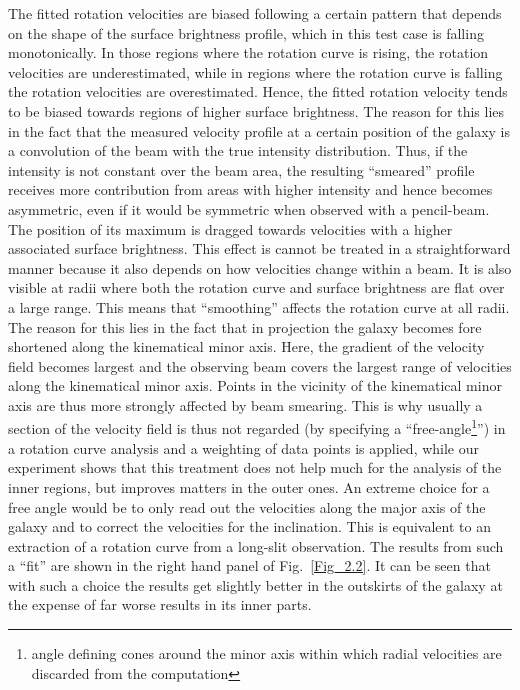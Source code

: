 \documentclass[oldversion]{aa}
\newcommand{\cng}[1]{{#1}}
\begin{document}
The fitted rotation velocities are biased following a certain pattern
that depends on the shape of the surface brightness profile, which in
this test case is falling monotonically.  In those regions where the
rotation curve is rising, the rotation velocities are underestimated,
while in regions where the rotation curve is falling the rotation
velocities are overestimated.  Hence, the fitted rotation velocity tends
to be biased towards regions of higher surface brightness.  The reason
for this lies in the fact that the measured velocity profile at a
certain position of the galaxy is a convolution of the beam with the
true intensity distribution.  Thus, if the intensity is not constant
over the beam area, the resulting ``smeared'' profile receives more
contribution from areas with higher intensity and hence becomes
asymmetric, even if it would be symmetric \cng{when observed with} a pencil-beam.  The
position of its maximum is dragged towards velocities with a higher
associated surface brightness.  This effect is \cng{cannot be treated} in a
straightforward manner  because it also depends on how velocities
change within a beam. It is also visible at radii where both the
rotation curve and surface brightness are flat over a large range.  This
means that ``smoothing'' affects the rotation curve at all radii.  The
reason for this lies in the fact that in projection the galaxy becomes
\cng{fore shortened} along the kinematical minor axis. \cng{Here, t}he gradient of the
velocity field becomes largest and the \cng{observing} beam covers the
largest range of velocities along the kinematical minor axis. Points in
the vicinity of the kinematical minor axis are thus more strongly
affected by beam smearing. \cng{This is why u}sually a section of the velocity field is
thus not regarded (by specifying a ``free-angle\footnote{angle defining
cones around the minor axis within which radial velocities are discarded
from the computation}'') in a rotation curve analysis and a weighting of
data points is applied, while our experiment shows that this treatment
does not help much for the analysis of the inner regions, but improves
matters in the outer ones.  An extreme choice for a free angle would be
to only read out the velocities along the major axis of the galaxy and
to correct the velocities for the inclination.  This is equivalent to an
extraction of a rotation curve from a long-slit observation.  The
results from such a ``fit'' are shown in \cng{the right hand panel of} Fig.~\ref{Fig_2.2}.  It can be
seen that with such a choice the results get slightly better in the
outskirts of the galaxy at the expense of far worse results in \cng{its inner parts}. 
\end{document}

